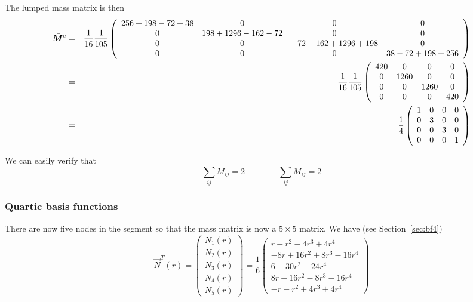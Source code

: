 The lumped mass matrix is then
\begin{eqnarray}
\bar{\bm M}^e 
&=&
\frac{1}{16}\frac{1}{105}
\left(
\begin{array}{cccc}
256 + 198 -72  +38 & 0 & 0 & 0  \\
0 & 198 + 1296  -162 -72 & 0 & 0\\
0 & 0 & -72 -162 + 1296 + 198 & 0\\
0 & 0 & 0 & 38 -72 + 198 + 256
\end{array}
\right) \nonumber\\
&=&
\frac{1}{16}\frac{1}{105}
\left(
\begin{array}{cccc}
420 & 0 & 0 & 0  \\
0 & 1260 & 0 & 0\\
0 & 0 & 1260 & 0\\
0 & 0 & 0 & 420
\end{array}
\right) \nonumber\\
&=&
\frac{1}{4}
\left(
\begin{array}{cccc}
1 & 0 & 0 & 0  \\
0 & 3 & 0 & 0\\
0 & 0 & 3 & 0\\
0 & 0 & 0 & 1
\end{array}
\right) \nonumber
\end{eqnarray}


We can easily verify that
\[
\sum_{ij} M_{ij} = 2
\qquad
\qquad
\sum_{ij} \bar{M}_{ij} = 2
\]


\subsubsection{Quartic basis functions}
There are now five nodes in the segment so that the mass matrix 
is now a $5\times5$ matrix. We have (see Section~\ref{sec:bf4}) 
\begin{equation}
{\vec N}^T(r) = 
\left(
\begin{array}{c}
N_1(r) \\ 
N_2(r) \\ 
N_3(r) \\ 
N_4(r) \\ 
N_5(r) 
\end{array}
\right)
=
\frac{1}{6}
\left(
\begin{array}{c}
  r- r^2 -4r^3 +4r^4 \\
  -8r+16 r^2 +8r^3 -16 r^4  \\
6 -30r^2+24r^4   \\
  8r+16 r^2 -8r^3 -16 r^4  \\
  -r- r^2 +4r^3 +4r^4
\end{array}
\right)
\end{equation}


